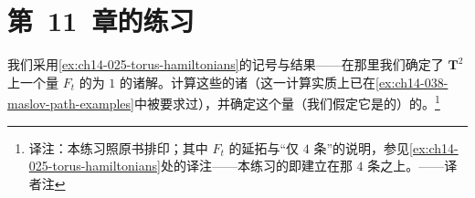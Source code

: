 
\section{第~11~章的练习}
\label{sec:ch14-exercises-ch11}

%

\begin{exercise}\label{ex:ch14-047-torus-floer-complex}
我们采用\cref{ex:ch14-025-torus-hamiltonians}的记号与结果——在那里我们确定了\trTorus{} $\mathbf{T}^{2}$ 上一个\trHamiltonian{}量 $F_t$ 的\trPeriodic{}为 $1$ 的诸\trContractible\trPeriodic{}解。计算这些\trTrajectory{}的诸\trIndex（这一计算实质上已在\cref{ex:ch14-038-maslov-path-examples}中被要求过），并确定这个\trHamiltonian{}量（我们假定它是\trRegular{}的）的\trFloerComplex。\footnote{译注：本练习照原书排印；其中 $F_t$ 的\trPeriodic{}延拓与“仅 $4$ 条\trContractible\trNondegenerate\trTrajectory”的说明，参见\cref{ex:ch14-025-torus-hamiltonians}处的译注——本练习的\trFloerComplex{}即建立在那 $4$ 条\trContractible\trTrajectory{}之上。——译者注}
\end{exercise}
